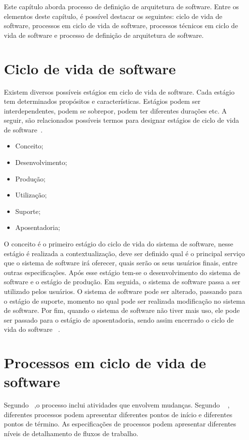 Este capítulo aborda processo de definição de arquitetura de software. Entre os elementos deste capítulo, é possível destacar os seguintes: ciclo de vida de software, processos em ciclo de vida de software, processos técnicos em ciclo de vida de software e processo de definição de arquitetura de software.

\section{Ciclo de vida de software}

Existem diversos possíveis estágios em ciclo de vida de software. Cada estágio tem determinados propósitos e características. Estágios podem ser interdependentes, podem se sobrepor, podem ter diferentes durações etc. A seguir, são relacionados possíveis termos para designar estágios de ciclo de vida de software~\cite{ISO_247483}. 

\begin{itemize}
    \item Conceito;
    \item Desenvolvimento;
    \item Produção;
    \item Utilização;
    \item Suporte;
    \item Aposentadoria;
\end{itemize}

O conceito é o primeiro estágio do ciclo de vida do sistema de software, nesse estágio é realizada a contextualização, deve ser definido qual é o principal serviço que o sistema de software irá oferecer, quais serão os seus usuários finais, entre outras especificações. Após esse estágio tem-se o desenvolvimento do sistema de software e o estágio de produção. Em seguida, o sistema de software passa a ser utilizado pelos usuários. O sistema de software pode ser alterado, passando para o estágio de suporte, momento no qual pode ser realizada modificação no sistema de software. Por fim, quando o sistema de software não tiver mais uso, ele pode ser passado para o estágio de aposentadoria, sendo assim encerrado o ciclo de vida do software ~\cite{ISO_247483}.

\section{Processos em ciclo de vida de software}

Segundo ~\cite{Sommerville_2011_texbook},o processo inclui atividades que envolvem mudanças. Segundo ~\cite{Sevocab} , diferentes processos podem apresentar diferentes pontos de início e diferentes pontos de término. As especificações de processos podem apresentar diferentes níveis de detalhamento de fluxos de trabalho.


